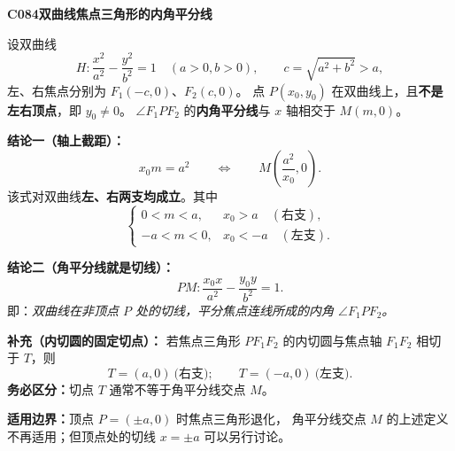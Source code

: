 \begin{statementbox}
\textbf{C084\quad 双曲线焦点三角形的内角平分线}

设双曲线
\[
H:\frac{x^2}{a^2}-\frac{y^2}{b^2}=1\quad(a>0,b>0),
\qquad c=\sqrt{a^2+b^2}>a,
\]
左、右焦点分别为 $F_1(-c,0)$、$F_2(c,0)$。
点 $P(x_0,y_0)$ 在双曲线上，且\textbf{不是左右顶点}，即 $y_0\ne0$。
$\angle F_1PF_2$ 的\textbf{内角平分线}与 $x$ 轴相交于 $M(m,0)$。

\textbf{结论一（轴上截距）：}
\[
\boxed{x_0m=a^2}\qquad\Longleftrightarrow\qquad
\boxed{M\left(\frac{a^2}{x_0},0\right)}.
\]
该式对双曲线\textbf{左、右两支均成立}。其中
\[
\begin{cases}
0<m<a,&x_0>a\quad(\text{右支}),\\
-a<m<0,&x_0<-a\quad(\text{左支}).
\end{cases}
\]

\textbf{结论二（角平分线就是切线）：}
\[
\boxed{PM:\frac{x_0x}{a^2}-\frac{y_0y}{b^2}=1}.
\]
即：\emph{双曲线在非顶点 $P$ 处的切线，平分焦点连线所成的内角
$\angle F_1PF_2$。}

\textbf{补充（内切圆的固定切点）：}
若焦点三角形 $PF_1F_2$ 的内切圆与焦点轴 $F_1F_2$ 相切于 $T$，则
\[
\boxed{T=(a,0)\ \text{(右支)};
\qquad T=(-a,0)\ \text{(左支)}}.
\]
\textbf{务必区分：}切点 $T$ 通常不等于角平分线交点 $M$。

\textbf{适用边界：}顶点 $P=(\pm a,0)$ 时焦点三角形退化，
角平分线交点 $M$ 的上述定义不再适用；但顶点处的切线
$x=\pm a$ 可以另行讨论。
\end{statementbox}
